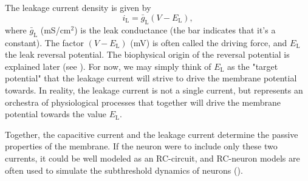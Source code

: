 \subsection{}
\label{sec:Neuron:leak}
The leakage current density is given by
\begin{equation}
i_{\mathrm{L}} = \bar{g}_{\mathrm{L}} (V - E_{\mathrm{L}}),
\label{eq:Neuron:HHleak}
\end{equation}
where $\bar{g}_{\mathrm{L}}$ (mS/cm$^2$) is the leak conductance (the bar indicates that it's a constant). 
The factor $(V - E_{\mathrm{L}})$ (\si{\milli\volt}) is often called the driving force,  and $E_{\mathrm{L}}$ the leak reversal potential. The biophysical origin of the reversal potential is explained later (see ). For now, we may simply think of $E_{\mathrm{L}}$ as the "target potential" that the leakage current will strive to drive the membrane potential towards. In reality, the leakage current is not a single current, but represents an orchestra of physiological processes that together will drive the membrane potential towards the value $E_{\mathrm{L}}$. 

Together, the capacitive current and the leakage current determine the passive properties of the membrane. If the neuron were to include only these two currents, it could be well modeled as an RC-circuit, and RC-neuron models are often used to simulate the subthreshold dynamics of neurons (). 

